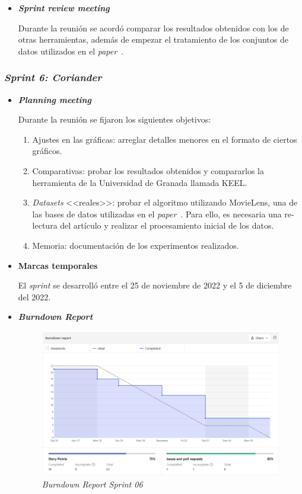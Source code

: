 \begin{itemize}
	\item \textbf{\textit{Sprint review meeting}}

	Durante la reunión se acordó comparar los resultados obtenidos con los de otras herramientas, además de empezar el tratamiento de los conjuntos de datos utilizados en el \textit{paper}~\cite{zhou2021SemisupervisedRecommendationAttack}.
	
\end{itemize}


\subsubsection{\textit{Sprint 6: Coriander}}
\begin{itemize}
	\item \textbf{\textit{Planning meeting}}
	
	Durante la reunión se fijaron los siguientes objetivos:
	
		\begin{enumerate}
		\item Ajustes en las gráficas: arreglar detalles menores en el formato de ciertos gráficos.
		\item Comparativas: probar los resultados obtenidos y compararlos la herramienta de la Universidad de Granada llamada KEEL.
		\item \textit{Datasets} <<reales>>: probar el algoritmo utilizando MovieLens, una de las bases de datos utilizadas en el \textit{paper}~\cite{zhou2021SemisupervisedRecommendationAttack}. Para ello, es necesaria una re-lectura del artículo y realizar el procesamiento inicial de los datos.
		\item Memoria: documentación de los experimentos realizados.
	\end{enumerate}

	\item \textbf{Marcas temporales}	
		
	El \textit{sprint} se desarrolló entre el 25 de noviembre de 2022 y el 5 de diciembre del 2022.
	
	\item \textbf{\textit{Burndown Report}}
		\begin{figure}[h]
			\caption[\textit{Sprint} 06: \textit{burndown report}]{\textit{Burndown Report Sprint 06}}
			\centering
			\includegraphics[width=\textwidth]{../img/anexos/bdr/s06_bdr}
		\end{figure}
	

\end{itemize}
